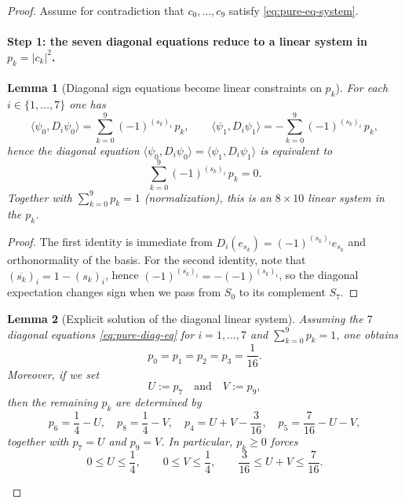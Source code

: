 \documentclass[11pt]{article}
\newtheorem{lemma}{Lemma}
\begin{document}
\begin{proof}
Assume for contradiction that $c_0,\dots,c_9$ satisfy \eqref{eq:pure-eq-system}.

\paragraph{Step 1: the seven diagonal equations reduce to a linear system in $p_k=|c_k|^2$.}

\begin{lemma}[Diagonal sign equations become linear constraints on $p_k$]
\label{lem:pure-diag-linear}
For each $i\in\{1,\dots,7\}$ one has
\[
\langle \psi_0,D_i\psi_0\rangle=\sum_{k=0}^9 (-1)^{(s_k)_i}\,p_k,
\qquad
\langle \psi_1,D_i\psi_1\rangle=-\sum_{k=0}^9 (-1)^{(s_k)_i}\,p_k,
\]
hence the diagonal equation $\langle \psi_0,D_i\psi_0\rangle=\langle \psi_1,D_i\psi_1\rangle$ is equivalent to
\begin{equation}
\sum_{k=0}^9 (-1)^{(s_k)_i}\,p_k = 0.
\label{eq:pure-diag-eq}
\end{equation}
Together with $\sum_{k=0}^9 p_k=1$ (normalization), this is an $8\times 10$ linear system in the $p_k$.
\end{lemma}

\begin{proof}
The first identity is immediate from $D_i(e_{s_k})=(-1)^{(s_k)_i}e_{s_k}$ and orthonormality of the basis.
For the second identity, note that $(\overline{s_k})_i = 1-(s_k)_i$, hence $(-1)^{(\overline{s_k})_i}=-(-1)^{(s_k)_i}$,
so the diagonal expectation changes sign when we pass from $S_0$ to its complement $S_7$.
\end{proof}

\begin{lemma}[Explicit solution of the diagonal linear system]
\label{lem:pure-diag-solve}
Assuming the $7$ diagonal equations \eqref{eq:pure-diag-eq} for $i=1,\dots,7$ and $\sum_{k=0}^9 p_k=1$,
one obtains
\begin{equation}
p_0=p_1=p_2=p_3=\frac{1}{16}.
\label{eq:pure-four-fixed}
\end{equation}
Moreover, if we set
\[
U:=p_7\quad\text{and}\quad V:=p_9,
\]
then the remaining $p_k$ are determined by
\begin{equation}
p_6=\frac14-U,\quad p_8=\frac14-V,\quad
p_4=U+V-\frac{3}{16},\quad p_5=\frac{7}{16}-U-V,
\label{eq:pure-diag-param}
\end{equation}
together with $p_7=U$ and $p_9=V$.
In particular, $p_k\ge 0$ forces
\[
0\le U\le\frac14,\qquad 0\le V\le\frac14,\qquad \frac{3}{16}\le U+V\le\frac{7}{16}.
\]
\end{lemma}


\end{proof}
\end{document}
